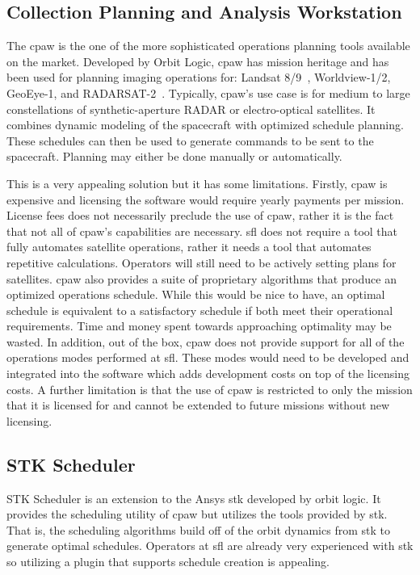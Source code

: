 \subsection{Collection Planning and Analysis Workstation}

The \acrfull{cpaw} is the one of the more sophisticated operations planning
tools available on the market.  Developed by Orbit Logic, \gls{cpaw} has
mission heritage and has been used for planning imaging operations for: Landsat
8/9~\cite{gokhale_mission_2019}, Worldview-1/2, GeoEye-1, and
RADARSAT-2~\cite{herz_eo_2014}.  Typically, \gls{cpaw}'s use case is for medium
to large constellations of synthetic-aperture RADAR or electro-optical
satellites. It combines dynamic modeling of the spacecraft with optimized
schedule planning. These schedules can then be used to generate commands to be
sent to the spacecraft. Planning may either be done manually or automatically. 

This is a very appealing solution but it has some limitations. Firstly,
\gls{cpaw} is expensive and licensing the software would require yearly
payments per mission. License fees does not necessarily preclude the use of
\gls{cpaw}, rather it is the fact that not all of \gls{cpaw}'s capabilities are
necessary.  \gls{sfl} does not require a tool that fully automates satellite
operations, rather it needs a tool that automates repetitive calculations.
Operators will still need to be actively setting plans for satellites.
\gls{cpaw} also provides a suite of proprietary algorithms that produce an
optimized operations schedule.  While this would be nice to have, an optimal
schedule is equivalent to a satisfactory schedule if both meet their
operational requirements. Time and money spent towards approaching optimality
may be wasted. In addition, out of the box, \gls{cpaw} does not provide support
for all of the operations modes performed at \gls{sfl}. These modes would need
to be developed and integrated into the software which adds development costs
on top of the licensing costs. A further limitation is that the use of
\gls{cpaw} is restricted to only the mission that it is licensed for and cannot
be extended to future missions without new licensing.


\subsection{STK Scheduler} 

STK Scheduler is an extension to the Ansys \acrlong{stk} developed by orbit
logic. It provides the scheduling utility of \gls{cpaw} but utilizes the tools
provided by \gls{stk}. That is, the scheduling algorithms build off of the
orbit dynamics from \gls{stk} to generate optimal schedules. Operators at
\gls{sfl} are already very experienced with \gls{stk} so utilizing a plugin
that supports schedule creation is appealing.

